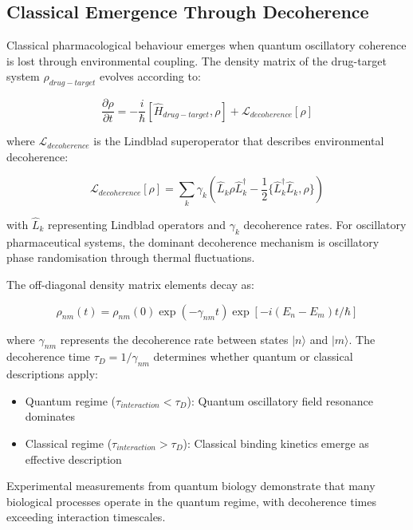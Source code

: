 \documentclass{article}
\theoremstyle{definition}
\theoremstyle{remark}
\begin{document}
\subsection{Classical Emergence Through Decoherence}

Classical pharmacological behaviour emerges when quantum oscillatory coherence is lost through environmental coupling. The density matrix of the drug-target system $\rho_{drug-target}$ evolves according to:

\begin{equation}
\frac{\partial \rho}{\partial t} = -\frac{i}{\hbar}[\hat{H}_{drug-target}, \rho] + \mathcal{L}_{decoherence}[\rho]
\label{eq:density_matrix_evolution}
\end{equation}

where $\mathcal{L}_{decoherence}$ is the Lindblad superoperator that describes environmental decoherence:

\begin{equation}
\mathcal{L}_{decoherence}[\rho] = \sum_k \gamma_k \left( \hat{L}_k \rho \hat{L}_k^\dagger - \frac{1}{2}\{\hat{L}_k^\dagger \hat{L}_k, \rho\} \right)
\end{equation}

with $\hat{L}_k$ representing Lindblad operators and $\gamma_k$ decoherence rates. For oscillatory pharmaceutical systems, the dominant decoherence mechanism is oscillatory phase randomisation through thermal fluctuations.

The off-diagonal density matrix elements decay as:

\begin{equation}
\rho_{nm}(t) = \rho_{nm}(0) \exp(-\gamma_{nm} t) \exp\left[-i(E_n - E_m)t/\hbar\right]
\end{equation}

where $\gamma_{nm}$ represents the decoherence rate between states $|n\rangle$ and $|m\rangle$. The decoherence time $\tau_D = 1/\gamma_{nm}$ determines whether quantum or classical descriptions apply:

\begin{itemize}
\item Quantum regime ($\tau_{interaction} < \tau_D$): Quantum oscillatory field resonance dominates
\item Classical regime ($\tau_{interaction} > \tau_D$): Classical binding kinetics emerge as effective description
\end{itemize}

Experimental measurements from quantum biology demonstrate that many biological processes operate in the quantum regime, with decoherence times exceeding interaction timescales\cite{Lambert2013}.
\end{document}

